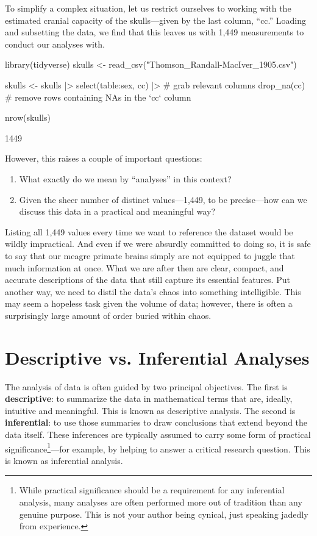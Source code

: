 

To simplify a complex situation, let us restrict ourselves to working with the estimated cranial capacity of the skulls—given by the last column, ``cc.'' Loading and subsetting the data, we find that this leaves us with 1,449 measurements to conduct our analyses with.

\begin{inR}
library(tidyverse)
skulls <- read_csv("Thomson_Randall-MacIver_1905.csv")

skulls <- skulls |> 
  select(table:sex, cc) |> # grab relevant columns
  drop_na(cc) # remove rows containing NAs in the `cc` column
  
nrow(skulls)
\end{inR}

\begin{outR}
[1] 1449
\end{outR}

\noindent
However, this raises a couple of important questions:

\begin{enumerate}
    \item What exactly do we mean by ``analyses'' in this context?
    \item Given the sheer number of distinct values—1,449, to be precise—how can we discuss this data in a practical and meaningful way?
\end{enumerate}

Listing all 1,449 values every time we want to reference the dataset would be wildly impractical. And even if we were absurdly committed to doing so, it is safe to say that our meagre primate brains simply are not equipped to juggle that much information at once. What we are after then are clear, compact, and accurate descriptions of the data that still capture its essential features. Put another way, we need to distil the data's chaos into something intelligible. This may seem a hopeless task given the volume of data; however, there is often a surprisingly large amount of order buried within chaos.

\section{Descriptive vs. Inferential Analyses}

The analysis of data is often guided by two principal objectives. The first is \textbf{descriptive}: to summarize the data in mathematical terms that are, ideally, intuitive and meaningful. This is known as \gls{descriptive analysis}. The second is \textbf{inferential}: to use those summaries to draw conclusions that extend beyond the data itself. These inferences are typically assumed to carry some form of practical significance\footnote{While practical significance should be a requirement for any inferential analysis, many analyses are often performed more out of tradition than any genuine purpose. This is not your author being cynical, just speaking jadedly from experience.}—for example, by helping to answer a critical research question. This is known as inferential analysis.

